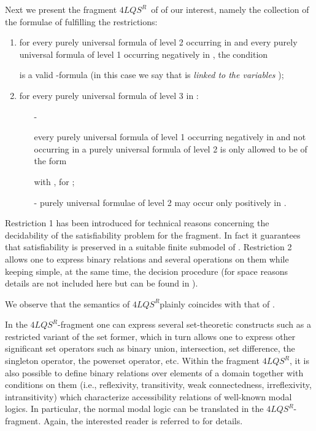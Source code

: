 \documentclass[a4paper]{llncs}
\newcommand{\flqsr}{\ensuremath{4LQS^R}}
\begin{document}
Next we present the fragment \flqsr\ of  of our interest, namely the collection of the formulae  of  fulfilling the restrictions:
\begin{enumerate}
\item{for every purely universal formula  of level 2 occurring in  and every purely universal formula  of level 1 occurring negatively in ,
the condition

is a valid -formula (in this case we say that  is \emph{linked to the variables} );
}

\item{ for every purely universal formula    of level 3 in :
\begin{itemize}
\item[-]{every purely universal formula of level 1 occurring negatively in  and not occurring in a purely universal formula of level 2 is only allowed to be of the form

with , for ;}
\item[-]{purely universal formulae  of level 2 may occur only positively in .}
\end{itemize}
}
\end{enumerate}

Restriction 1 has been introduced for technical reasons concerning the decidability of the satisfiability problem for the fragment. In fact it guarantees that satisfiability is preserved in a suitable finite submodel of .  Restriction  2 allows one to express binary relations and several operations on them while keeping simple, at the same time, the decision procedure (for space reasons details are not included here but can be found in \cite{CanNic2013}).

We observe that the semantics of \flqsr\space plainly coincides with that of .

In the \flqsr-fragment one can express several set-theoretic constructs such as a restricted variant of the set former, which in
turn allows one to express other significant set operators such as binary union, intersection, set difference,
the singleton operator, the powerset operator, etc. Within the fragment \flqsr, it is also possible to define binary relations over elements of a domain
together with conditions on them (i.e., reflexivity, transitivity, weak connectedness, irreflexivity, intransitivity) which characterize accessibility relations of well-known modal logics. In particular, the normal modal logic  can be translated in the \flqsr-fragment. Again, the interested reader is referred to \cite{CanNic2013} for details.
\end{document}

